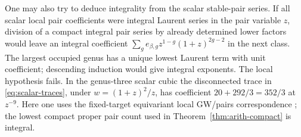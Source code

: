 One may also try to deduce integrality from the scalar stable-pair
series. If all scalar local pair coefficients were integral Laurent
series in the pair variable $z$, division of a compact integral pair
series by already determined lower factors would leave an integral
coefficient $\sum_g e_{\beta,g}z^{1-g}(1+z)^{2g-2}$ in the next
class. The largest occupied genus has a unique lowest Laurent term
with unit coefficient; descending induction would give integral
exponents. The local hypothesis fails. In the genus-three scalar
cubic the disconnected trace in \eqref{eq:scalar-traces}, under
$w=(1+z)^2/z$, has coefficient $20+292/3=352/3$ at $z^{-9}$.
Here one uses the fixed-target equivariant local GW/pairs correspondence
\cite[Section~4.2]{Pardon}; the lowest compact proper pair count used
in Theorem~\ref{thm:arith-compact} is integral.
